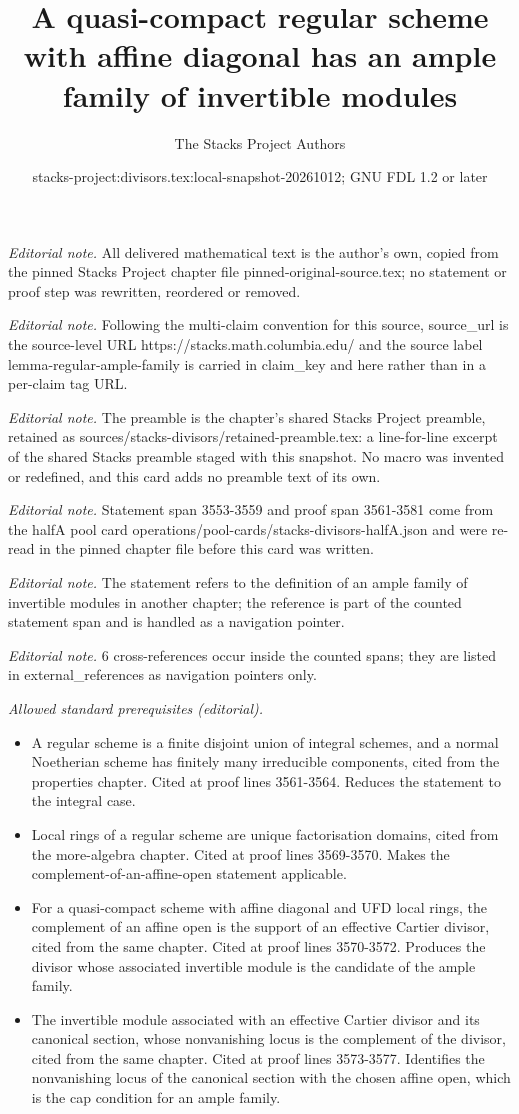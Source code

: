 \documentclass[10pt,a4paper]{amsart}
\title{A quasi-compact regular scheme with affine diagonal has an ample family of invertible modules}
\author{The Stacks Project Authors}
\date{stacks-project:divisors.tex:local-snapshot-20261012; GNU FDL 1.2 or later}
\theoremstyle{plain}
\theoremstyle{definition}
\theoremstyle{remark}
\numberwithin{equation}{subsection}
\begin{document}
\maketitle
\noindent\textit{Editorial note.} All delivered mathematical text is the author's own, copied from the pinned Stacks Project chapter file pinned-original-source.tex; no statement or proof step was rewritten, reordered or removed.\par\medskip
\noindent\textit{Editorial note.} Following the multi-claim convention for this source, source\_url is the source-level URL https://stacks.math.columbia.edu/ and the source label lemma-regular-ample-family is carried in claim\_key and here rather than in a per-claim tag URL.\par\medskip
\noindent\textit{Editorial note.} The preamble is the chapter's shared Stacks Project preamble, retained as sources/stacks-divisors/retained-preamble.tex: a line-for-line excerpt of the shared Stacks preamble staged with this snapshot. No macro was invented or redefined, and this card adds no preamble text of its own.\par\medskip
\noindent\textit{Editorial note.} Statement span 3553-3559 and proof span 3561-3581 come from the halfA pool card operations/pool-cards/stacks-divisors-halfA.json and were re-read in the pinned chapter file before this card was written.\par\medskip
\noindent\textit{Editorial note.} The statement refers to the definition of an ample family of invertible modules in another chapter; the reference is part of the counted statement span and is handled as a navigation pointer.\par\medskip
\noindent\textit{Editorial note.} 6 cross-references occur inside the counted spans; they are listed in external\_references as navigation pointers only.\par\medskip
\noindent\textit{Allowed standard prerequisites (editorial).}\begin{itemize}
\item A regular scheme is a finite disjoint union of integral schemes, and a normal Noetherian scheme has finitely many irreducible components, cited from the properties chapter. Cited at proof lines 3561-3564. Reduces the statement to the integral case.
\item Local rings of a regular scheme are unique factorisation domains, cited from the more-algebra chapter. Cited at proof lines 3569-3570. Makes the complement-of-an-affine-open statement applicable.
\item For a quasi-compact scheme with affine diagonal and UFD local rings, the complement of an affine open is the support of an effective Cartier divisor, cited from the same chapter. Cited at proof lines 3570-3572. Produces the divisor whose associated invertible module is the candidate of the ample family.
\item The invertible module associated with an effective Cartier divisor and its canonical section, whose nonvanishing locus is the complement of the divisor, cited from the same chapter. Cited at proof lines 3573-3577. Identifies the nonvanishing locus of the canonical section with the chosen affine open, which is the cap condition for an ample family.
\end{itemize}\medskip
\end{document}
